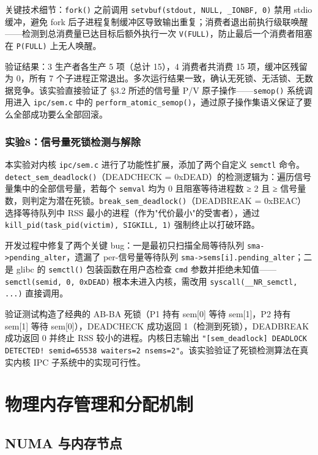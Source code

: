 \documentclass[a4paper]{article}
\begin{document}
关键技术细节：\texttt{fork()} 之前调用 \texttt{setvbuf(stdout, NULL, \_IONBF, 0)} 禁用 stdio 缓冲，避免 fork 后子进程复制缓冲区导致输出重复；消费者退出前执行级联唤醒——检测到总消费量已达目标后额外执行一次 \texttt{V(FULL)}，防止最后一个消费者阻塞在 \texttt{P(FULL)} 上无人唤醒。

验证结果：3 生产者各生产 5 项（总计 15），4 消费者共消费 15 项，缓冲区残留为 0，所有 7 个子进程正常退出。多次运行结果一致，确认无死锁、无活锁、无数据竞争。该实验直接验证了 §3.2 所述的信号量 P/V 原子操作——\texttt{semop()} 系统调用进入 \texttt{ipc/sem.c} 中的 \texttt{perform\_atomic\_semop()}，通过原子操作集语义保证了要么全部成功要么全部回滚。

\subsubsection{实验8：信号量死锁检测与解除}

本实验对内核 \texttt{ipc/sem.c} 进行了功能性扩展，添加了两个自定义 \texttt{semctl} 命令。\texttt{detect\_sem\_deadlock()}（DEADCHECK = 0xDEAD）的检测逻辑为：遍历信号量集中的全部信号量，若每个 \texttt{semval} 均为 0 且阻塞等待进程数 ≥ 2 且 ≥ 信号量数，则判定为潜在死锁。\texttt{break\_sem\_deadlock()}（DEADBREAK = 0xBEAC）选择等待队列中 RSS 最小的进程（作为"代价最小"的受害者），通过 \texttt{kill\_pid(task\_pid(victim), SIGKILL, 1)} 强制终止以打破环路。

开发过程中修复了两个关键 bug：一是最初只扫描全局等待队列 \texttt{sma->pending\_alter}，遗漏了 per-信号量等待队列 \texttt{sma->sems[i].pending\_alter}；二是 glibc 的 \texttt{semctl()} 包装函数在用户态检查 \texttt{cmd} 参数并拒绝未知值——\texttt{semctl(semid, 0, 0xDEAD)} 根本未进入内核，需改用 \texttt{syscall(\_\_NR\_semctl, ...)} 直接调用。

验证测试构造了经典的 AB-BA 死锁（P1 持有 sem[0] 等待 sem[1]，P2 持有 sem[1] 等待 sem[0]），DEADCHECK 成功返回 1（检测到死锁），DEADBREAK 成功返回 0 并终止 RSS 较小的进程。内核日志输出 \texttt{"[sem\_deadlock] DEADLOCK DETECTED! semid=65538 waiters=2 nsems=2"}。该实验验证了死锁检测算法在真实内核 IPC 子系统中的实现可行性。

\section{物理内存管理和分配机制} \label{sec:ch4}

\subsection{NUMA 与内存节点}
\end{document}
